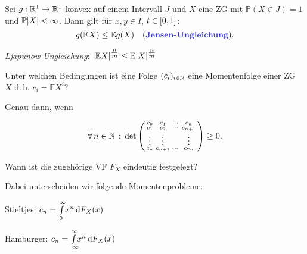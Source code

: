 \documentclass{cheat-sheet}
\renewcommand{\P}{\mathbb{P}} %
\newcommand{\E}{\mathbb{E}} %
\begin{document}
\begin{satz}
  Sei $g : \mathbb{R}^1 \to \mathbb{R}^1$ konvex auf einem Intervall $J$ und $X$ eine ZG mit $\P(X \in J) = 1$ und $\P \abs{X} < \infty$. Dann gilt für $x, y \in I$, $t \in \left[ 0, 1 \right]$:
  \[
    g(\E X) \leq \E g(X)
    \quad \text{(\emph{Jensen-Ungleichung}).}
  \]
\end{satz}

\iffalse
  Per Induktion folgt: $g(\sum_{i=1}^n \alpha_i x_i) \leq \sum_{i=1}^n \alpha_i g(x_i)$ für $x_1, ..., x_n \in J$, $\alpha_i \geq 0$, $\alpha_1 + ... + \alpha_n = 1$
\fi

\begin{kor}
  \emph{Ljapunow-Ungleichung}: $\abs{\E X}^{\tfrac{n}{m}} \leq \E \abs{X}^{\tfrac{n}{m}}$
\end{kor}

\begin{frage}[Momentenproblem (MP)]
  Unter welchen Bedingungen ist eine Folge $(c_i)_{i \in \mathbb{N}}$ eine Momentenfolge einer ZG $X$ d.\,h. $c_i = \E X^i$?
\end{frage}

\begin{antwort}

  Genau dann, wenn

  \[
    \forall \, {n \in \mathbb{N}} \,:\, \det \left( \begin{smallmatrix} c_0 & c_1 & \cdots & c_n \\ c_1 & c_2 & \cdots & c_{n+1} \\ \vdots & \vdots & & \vdots \\ c_n & c_{n+1} & \cdots & c_{2n} \end{smallmatrix} \right) \geq 0.
  \]
\end{antwort}

\begin{frage}
  Wann ist die zugehörige VF $F_X$ eindeutig festgelegt?
\end{frage}

\begin{bem}
  Dabei unterscheiden wir folgende Momentenprobleme:
  \begin{itemize}
    \begin{multicols}{2}
      \item Stieltjes: $c_n = {\textstyle \int\limits_{0}^{\infty}} x^n \,\mathrm{d} F_X(x)$
      \item Hamburger: $c_n = \Int{\mathclap{-\infty}}{\infty}{x^n}{F_X(x)}$
    \end{multicols}
  \end{itemize}
\end{bem}
\end{document}
